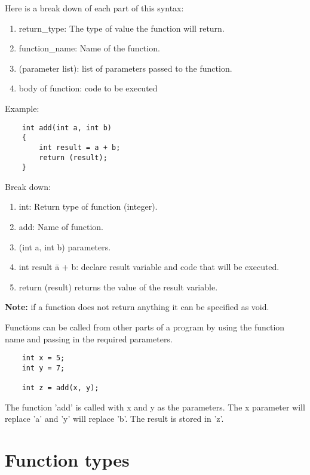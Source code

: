 \documentclass[12pt, letterpaper]{report}
\begin{document}
Here is a break down of each part of this syntax:

\begin{enumerate}
	\item return\_type: The type of value the function will return.
	\item function\_name: Name of the function.
	\item (parameter list): list of parameters passed to the function.
	\item body of function: code to be executed
\end{enumerate}

Example:
\begin{lstlisting}
	int add(int a, int b)
	{
		int result = a + b;
		return (result);
	}
\end{lstlisting}
 
Break down:
\begin{enumerate}
	\item int: Return type of function (integer).
	\item add: Name of function.
	\item (int a, int b)\: parameters.
	\item int result \= a + b: declare result variable and code that will be executed.
	\item return (result)\: returns the value of the result variable.
\end{enumerate}

\textbf{Note:} if a function does not return anything it can be specified as void.

Functions can be called from other parts of a program by using the function name 
and passing in the required parameters.

\begin{lstlisting}
	int x = 5;
	int y = 7;

	int z = add(x, y);
\end{lstlisting}
The function 'add' is called with x and y as the parameters. The x parameter 
will replace 'a' and 'y' will replace 'b'. The result is stored in 'z'.


\section{Function types}
\end{document}
